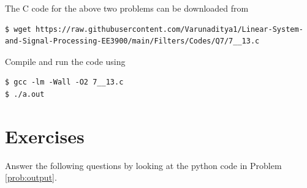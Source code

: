 \documentclass[journal,12pt,twocolumn]{IEEEtran}
\renewcommand\thesection{\arabic{section}}
\begin{document}
\begin{enumerate}[label=\thesection.\arabic*.,ref=\thesection.\theenumi]
\solution The C code for the above two problems can be downloaded from
\begin{lstlisting}
$ wget https://raw.githubusercontent.com/Varunaditya1/Linear-System-and-Signal-Processing-EE3900/main/Filters/Codes/Q7/7__13.c
\end{lstlisting}
Compile and run the code using
\begin{lstlisting}
$ gcc -lm -Wall -O2 7__13.c
$ ./a.out
\end{lstlisting}
\end{enumerate}

\section{Exercises}
\noindent Answer the following questions by looking at the python code in Problem \ref{prob:output}.
\end{document}

